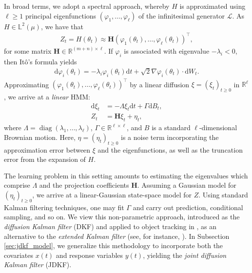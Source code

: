 \documentclass[11pt]{article}
\theoremstyle{plain}
\theoremstyle{definition}
\theoremstyle{remark}
\numberwithin{equation}{section}
\newcommand{\R}{\mathbb{R}}
\renewcommand{\L}{\mathscr{L}}
\renewcommand{\d}{\mathrm{d}}
\DeclareMathOperator{\diag}{diag}
\newcommand{\bL}{\mathbb{L}}
\begin{document}
In broad terms, we adopt a spectral approach, whereby $H$ is approximated using $\ell\ge1$ principal eigenfunctions $(\varphi_1,\dots, \varphi_\ell)$ of the infinitesimal generator $\L$. As $H\in \bL^2(\mu)$, we have that
\begin{align}
Z_t=H(\theta_t)\approx \mathbf{H} (\varphi_1(\theta_t),\dots,\varphi_\ell(\theta_t))^\top,
\end{align}
for some matrix $\mathbf{H}\in\R^{(m+n)\times\ell}$. If $\varphi_i$ is associated with eigenvalue $-\lambda_i<0$, then It\^{o}'s formula yields
\begin{align}
\d \varphi_i(\theta_t)=-\lambda_i \varphi_i(\theta_t) \d t+\sqrt{2} \nabla \varphi_i(\theta_t)\cdot \d W_t.
\end{align}
Approximating $(\varphi_1(\theta_t),\dots,\varphi_\ell(\theta_t))^\top$ by a linear diffusion $\xi=(\xi_t)_{t\ge 0}$ in $\R^\ell$, we arrive at a \emph{linear} HMM:
\begin{align}
\d \xi_t&=-\Lambda \xi_t\d t+\Gamma \d B_t,\\
Z_t&=\mathbf{H} \xi_t+\eta_t,
\end{align}
where $\Lambda=\diag(\lambda_1,\dots,\lambda_\ell)$, $\Gamma\in \R^{\ell\times\ell}$, and $B$ is a standard $\ell$-dimensional Brownian motion. Here, $\eta=(\eta_t)_{t\ge 0}$ is a noise term incorporating the approximation error between $\xi$ and the eigenfunctions, as well as the truncation error from the expansion of $H$.

The learning problem in this setting amounts to estimating the eigenvalues which comprise $\Lambda$ and the projection coefficients $\mathbf{H}$. 
Assuming a Gaussian model for $(\eta_t)_{t\ge 0}$, we arrive at a linear-Gaussian state-space model for $Z$. Using standard Kalman filtering techniques, one may fit $\Gamma$ and carry out prediction, conditional sampling, and so on. We view this non-parametric approach, introduced as the \emph{diffusion Kalman filter} (DKF) and applied to object tracking in \citet{shnitzer2020diffusion}, as an alternative to the \emph{extended Kalman filter} (see, for instance, \citet{Kailath99}). In Subsection \ref{sec:jdkf_model}, we generalize this methodology to incorporate both the covariates $x(t)$ and response variables $y(t)$, yielding the \emph{joint diffusion Kalman filter} (JDKF). 
\end{document}
